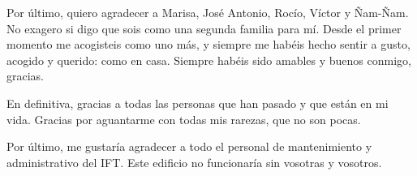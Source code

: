 Por último, quiero agradecer a Marisa, José Antonio, Rocío, Víctor y
Ñam-Ñam. No exagero si digo que sois como una segunda familia para
mí. Desde el primer momento me acogisteis como uno más, y siempre me
habéis hecho sentir a gusto, acogido y querido: como en casa.
Siempre habéis sido amables y buenos conmigo, gracias.

En definitiva, gracias a todas las personas que han pasado y que están en mi vida. Gracias por aguantarme con todas mis rarezas, que no son pocas. 

Por último, me gustaría agradecer a todo el personal de mantenimiento y administrativo del IFT. Este edificio no funcionaría sin vosotras y vosotros.

\bigskip

\endgroup
